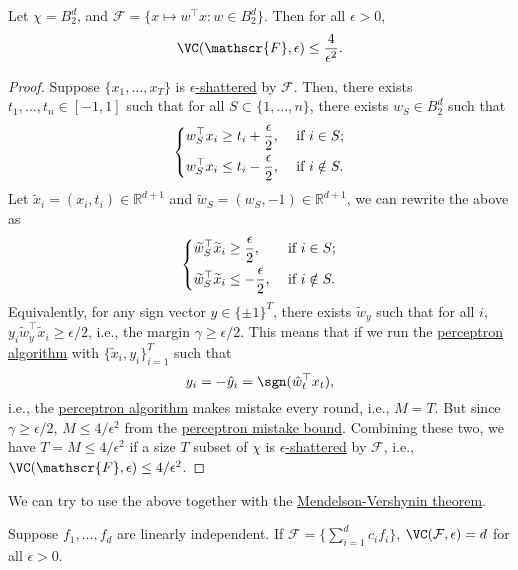 \begin{theorem}
	Let \(\chi = B_2^d\), and \(\mathscr{F} = \{ x \mapsto w^{\top} x \colon w \in B_2^d \} \). Then for all \(\epsilon > 0\),
	\[
		\VC(\mathscr{F} , \epsilon ) \leq \frac{4}{\epsilon ^2}.
	\]
\end{theorem}
\begin{proof}
	Suppose \(\{x_1, \ldots, x_T\}\) is \hyperref[def:eps-shattered]{\(\epsilon\)-shattered} by \(\mathcal{F}\). Then, there exists \(t_1, \ldots, t_n \in [-1,1]\) such that for all \(S \subset \{1, \ldots , n\}\), there exists \(w_S \in B_2^d\) such that
	\[
		\begin{dcases}
			w_S^{\top} x_i \geq t_i +\frac{\epsilon}{2}, & \text{ if } i \in S ;   \\
			w_S^{\top} x_i \leq t_i -\frac{\epsilon}{2}, & \text{ if } i \notin S.
		\end{dcases}
	\]
	Let \(\widetilde{x}_i = (x_i, t_i) \in \mathbb{R} ^{d+1}\) and \(\widetilde{w}_S = (w_S, -1) \in \mathbb{R} ^{d+1}\), we can rewrite the above as
	\[
		\begin{dcases}
			\widetilde{w}_S^{\top} \widetilde{x}_i \geq \frac{\epsilon}{2},  & \text{ if } i \in S ;    \\
			\widetilde{w}_S^{\top} \widetilde{x}_i \leq -\frac{\epsilon}{2}, & \text{ if } i \notin S .
		\end{dcases}
	\]
	Equivalently, for any sign vector \(y\in \{ \pm 1 \} ^T\), there exists \(\widetilde{w} _y\) such that for all \(i\), \(y_i \widetilde{w} _y ^{\top} \widetilde{x} _i \geq \epsilon / 2\), i.e., the margin \(\gamma \geq \epsilon / 2\). This means that if we run the \hyperref[algo:perceptron]{perceptron algorithm} with \(\{\widetilde{x}_i, y_i\}_{i=1}^T\) such that
	\[
		y_i = - \hat{y} _i = \sgn (\hat{w} _t ^{\top} x_t),
	\]
	i.e., the \hyperref[algo:perceptron]{perceptron algorithm} makes mistake every round, i.e., \(M = T\). But since \(\gamma \geq \epsilon / 2\), \(M \leq 4/\epsilon^2\) from the \hyperref[lma:perceptron-mistake-bound]{perceptron mistake bound}. Combining these two, we have \(T = M \leq 4 / \epsilon ^2\) if a size \(T\) subset of \(\chi \) is \hyperref[def:eps-shattered]{\(\epsilon\)-shattered} by \(\mathcal{F}\), i.e., \(\VC(\mathscr{F} , \epsilon ) \leq 4 / \epsilon ^2\).
\end{proof}

\begin{remark}
	We can try to use the above together with the \hyperref[thm:Mendelson-Vershynin]{Mendelson-Vershynin theorem}.
\end{remark}

\begin{remark}
	Suppose \(f_1,\ldots,f_d\) are linearly independent. If \(\mathcal{F} = \{\sum_{i=1}^d c_i f_i\}\), \(\VC(\mathcal{F}, \epsilon) = d\) for all \(\epsilon > 0\).
\end{remark}